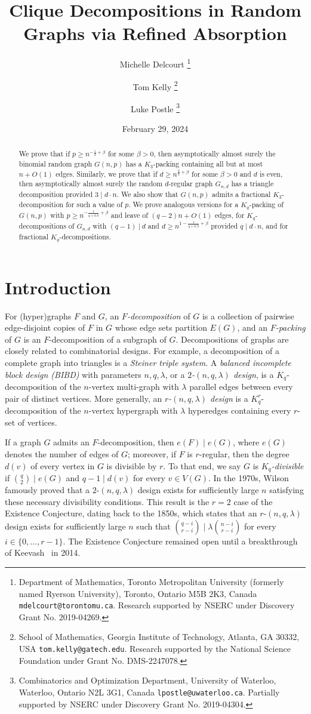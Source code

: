\documentclass[11pt]{article}
\title{Clique Decompositions in Random Graphs via Refined Absorption}
\author{
Michelle Delcourt
\thanks{Department of Mathematics, Toronto Metropolitan University (formerly named Ryerson University),
Toronto, Ontario M5B 2K3, Canada {\tt mdelcourt@torontomu.ca}. Research supported by NSERC under Discovery Grant No. 2019-04269.}
\and
Tom Kelly
\thanks{School of Mathematics, Georgia Institute of Technology, Atlanta, GA 30332, USA {\tt tom.kelly@gatech.edu}.
Research supported by the National Science Foundation under Grant No. DMS-2247078.}
\and
Luke Postle
\thanks{Combinatorics and Optimization Department,
University of Waterloo, Waterloo, Ontario N2L 3G1, Canada {\tt lpostle@uwaterloo.ca}. Partially supported by NSERC
under Discovery Grant No. 2019-04304.}}
\date{February 29, 2024}
\numberwithin{equation}{section}
\newcounter{i}
\theoremstyle{plain}
\theoremstyle{plain} %
\theoremstyle{definition}
\begin{document}
\maketitle

\begin{abstract} 
We prove that if $p\ge n^{-\frac{1}{3}+\beta}$ for some $\beta > 0$, then asymptotically almost surely the binomial random graph $G(n,p)$ has a $K_3$-packing containing all but at most $n + O(1)$ edges. Similarly, we prove that if $d \ge n^{\frac{2}{3}+\beta}$ for some $\beta > 0$ and $d$ is even, then asymptotically almost surely the random $d$-regular graph $G_{n,d}$ has a triangle decomposition provided $3 \mid d \cdot n$. We also show that $G(n,p)$ admits a fractional $K_3$-decomposition for such a value of $p$. We prove analogous versions for a $K_q$-packing of $G(n,p)$ with $p\ge n^{-\frac{1}{q+0.5}+\beta}$ and leave of $(q-2)n+O(1)$ edges, for $K_q$-decompositions of $G_{n,d}$ with $(q-1)~|~d$ and $d\ge n^{1-\frac{1}{q+0.5}+\beta}$ provided $q\mid d\cdot n$, and for fractional $K_q$-decompositions.
\end{abstract}

\section{Introduction}


For (hyper)graphs $F$ and $G$, an \textit{$F$-decomposition} of $G$ is a collection of pairwise edge-disjoint copies of $F$ in $G$ whose edge sets partition $E(G)$, and an \textit{$F$-packing} of $G$ is an $F$-decomposition of a subgraph of $G$.  Decompositions of graphs are closely related to combinatorial designs.  For example, a decomposition of a complete graph into triangles is a \textit{Steiner triple system}.  A \textit{balanced incomplete block design (BIBD)} with parameters $n,q,\lambda$, or a \textit{$2$-$(n,q,\lambda)$ design}, is a $K_q$-decomposition of the $n$-vertex multi-graph with $\lambda$ parallel edges between every pair of distinct vertices.  More generally, an \textit{$r$-$(n,q,\lambda)$ design} is a $K_q^r$-decomposition of the $n$-vertex hypergraph with $\lambda$ hyperedges containing every $r$-set of vertices.

If a graph $G$ admits an $F$-decomposition, then $e(F)\mid e(G)$, where $e(G)$ denotes the number of edges of $G$; moreover, if $F$ is $r$-regular, then the degree $d(v)$ of every vertex in $G$ is divisible by $r$.  To that end, we say $G$ is \textit{$K_q$-divisible} if $\binom{q}{2} \mid e(G)$ and $q - 1 \mid d(v)$ for every $v \in V(G)$.  In the 1970s, Wilson~\cite{WiI, WiII, WiIII} famously proved that a $2$-$(n,q,\lambda)$ design exists for sufficiently large $n$ satisfying these necessary divisibility conditions.  This result is the $r = 2$ case of the Existence Conjecture, dating back to the 1850s, which states that an $r$-$(n,q,\lambda)$ design exists for sufficiently large $n$ such that $\binom{q - i}{r - i} \mid \lambda\binom{n - i}{r - i}$ for every $i \in \{0,\dots,r-1\}$.  The Existence Conjecture remained open until a breakthrough of Keevash~\cite{K14} in 2014.
\end{document}
